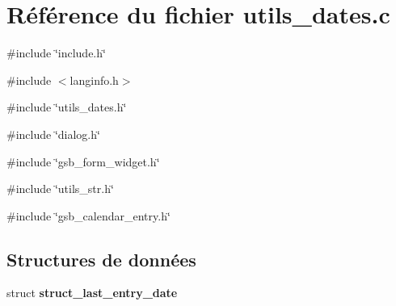 \section{Référence du fichier utils\_\-dates.c}
\label{utils__dates_8c}
{\ttfamily \#include \char`\"{}include.h\char`\"{}}\par
{\ttfamily \#include $<$langinfo.h$>$}\par
{\ttfamily \#include \char`\"{}utils\_\-dates.h\char`\"{}}\par
{\ttfamily \#include \char`\"{}dialog.h\char`\"{}}\par
{\ttfamily \#include \char`\"{}gsb\_\-form\_\-widget.h\char`\"{}}\par
{\ttfamily \#include \char`\"{}utils\_\-str.h\char`\"{}}\par
{\ttfamily \#include \char`\"{}gsb\_\-calendar\_\-entry.h\char`\"{}}\par
\subsection*{Structures de données}
\begin{DoxyCompactItemize}
\item 
struct {\bf struct\_\-last\_\-entry\_\-date}
\end{DoxyCompactItemize}
